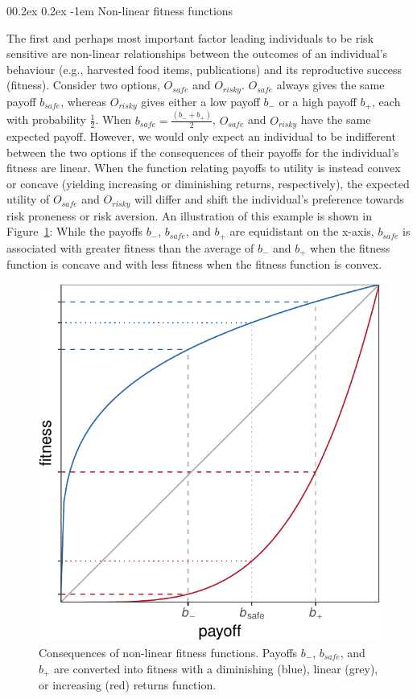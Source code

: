 \documentclass[british,,man,floatsintext]{apa6}
\makeatletter
\renewcommand{\paragraph}{\@startsection{paragraph}{4}{\parindent}%
  {0\baselineskip \@plus 0.2ex \@minus 0.2ex}%
  {-1em}%
  {\normalfont\normalsize\bfseries\itshape\typesectitle}}
\makeatother
\begin{document}
\hypertarget{non-linear-fitness-functions}{%
\paragraph{Non-linear fitness functions}\label{non-linear-fitness-functions}}

The first and perhaps most important factor leading individuals to be risk sensitive are non-linear relationships between the outcomes of an individual's behaviour (e.g., harvested food items, publications) and its reproductive success (fitness).
Consider two options, \(O_{safe}\) and \(O_{risky}\).
\(O_{safe}\) always gives the same payoff \(b_{safe}\), whereas \(O_{risky}\) gives either a low payoff \(b_-\) or a high payoff \(b_+\), each with probability \(\frac{1}{2}\).
When \(b_{safe} = \frac{(b_- + b_+)}{2}\), \(O_{safe}\) and \(O_{risky}\) have the same expected payoff.
However, we would only expect an individual to be indifferent between the two options if the consequences of their payoffs for the individual's fitness are linear.
When the function relating payoffs to utility is instead convex or concave (yielding increasing or diminishing returns, respectively), the expected utility of \(O_{safe}\) and \(O_{risky}\) will differ and shift the individual's preference towards risk proneness or risk aversion.
An illustration of this example is shown in Figure~\ref{fig:fitnessplot}:
While the payoffs \(b_-\), \(b_{safe}\), and \(b_+\) are equidistant on the x-axis, \(b_{safe}\) is associated with greater fitness than the average of \(b_-\) and \(b_+\) when the fitness function is concave and with less fitness when the fitness function is convex.



\begin{figure}

{\centering \includegraphics[width=0.5\linewidth]{rr-risk-sensitivity_files/figure-latex/fitnessplot-1} 

}

\caption{Consequences of non-linear fitness functions. Payoffs \(b_-\), \(b_{safe}\), and \(b_+\) are converted into fitness with a diminishing (blue), linear (grey), or increasing (red) returns function.}\label{fig:fitnessplot}
\end{figure}
\end{document}
